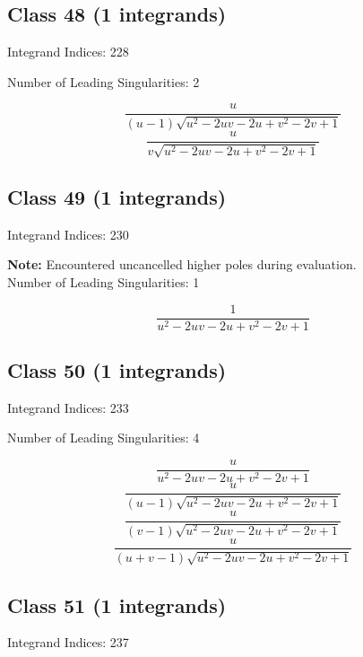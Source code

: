 \documentclass[11pt,a4paper]{article}
\begin{document}
\subsection*{Class 48 (1 integrands)}
Integrand Indices: 228

Number of Leading Singularities: 2

\begin{equation}
\frac{u}{(u-1) \sqrt{u^2-2 u v-2 u+v^2-2 v+1}}
\end{equation}
\begin{equation}
\frac{u}{v \sqrt{u^2-2 u v-2 u+v^2-2 v+1}}
\end{equation}


\subsection*{Class 49 (1 integrands)}
Integrand Indices: 230

\textbf{Note:} Encountered uncancelled higher poles during evaluation.\\[1em]

Number of Leading Singularities: 1

\begin{equation}
\frac{1}{u^2-2 u v-2 u+v^2-2 v+1}
\end{equation}


\subsection*{Class 50 (1 integrands)}
Integrand Indices: 233

Number of Leading Singularities: 4

\begin{equation}
\frac{u}{u^2-2 u v-2 u+v^2-2 v+1}
\end{equation}
\begin{equation}
\frac{u}{(u-1) \sqrt{u^2-2 u v-2 u+v^2-2 v+1}}
\end{equation}
\begin{equation}
\frac{u}{(v-1) \sqrt{u^2-2 u v-2 u+v^2-2 v+1}}
\end{equation}
\begin{equation}
\frac{u}{(u+v-1) \sqrt{u^2-2 u v-2 u+v^2-2 v+1}}
\end{equation}


\subsection*{Class 51 (1 integrands)}
Integrand Indices: 237
\end{document}
